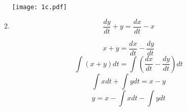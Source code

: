 \documentclass[10pt,a4paper, margin=1in]{article}
\begin{document}
\begin{enumerate}
\begin{enumerate}
    \texttt{[image: 1c.pdf]}
    \item %

\begin{equation}
    \frac{dy}{dt} + y =  \frac{dx}{dt} - x
\end{equation}

\begin{equation}
    x + y =  \frac{dx}{dt} -  \frac{dy}{dt}
\end{equation}
\begin{equation}
   \int (x + y)  dt = \int (\frac{dx}{dt} -  \frac{dy}{dt}) dt
\end{equation}
\begin{equation}
   \int x dt  + \int y dt = x -  y
\end{equation}
\begin{equation}
    y = x -  \int x dt  - \int y dt
\end{equation}


\begin{tikzpicture}[x=0.75pt,y=0.75pt,yscale=-1,xscale=1]


\end{tikzpicture}
\end{enumerate}
\end{enumerate}
\end{document}
